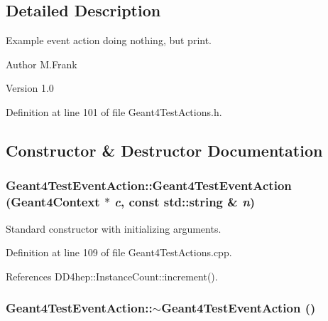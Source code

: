 \subsection{Detailed Description}
Example event action doing nothing, but print. \begin{DoxyAuthor}{Author}
M.Frank 
\end{DoxyAuthor}
\begin{DoxyVersion}{Version}
1.0 
\end{DoxyVersion}


Definition at line 101 of file Geant4TestActions.h.

\subsection{Constructor \& Destructor Documentation}
\hypertarget{class_d_d4hep_1_1_simulation_1_1_test_1_1_geant4_test_event_action_a00fe97a5df38edd9785f25af737cd7d0}{
\subsubsection[{Geant4TestEventAction}]{\setlength{\rightskip}{0pt plus 5cm}Geant4TestEventAction::Geant4TestEventAction ({\bf Geant4Context} $\ast$ {\em c}, \/  const std::string \& {\em n})}}
\label{class_d_d4hep_1_1_simulation_1_1_test_1_1_geant4_test_event_action_a00fe97a5df38edd9785f25af737cd7d0}


Standard constructor with initializing arguments. 

Definition at line 109 of file Geant4TestActions.cpp.

References DD4hep::InstanceCount::increment().\hypertarget{class_d_d4hep_1_1_simulation_1_1_test_1_1_geant4_test_event_action_abef0a0d05514f5882003ae2f45e59ed7}{
\subsubsection[{$\sim$Geant4TestEventAction}]{\setlength{\rightskip}{0pt plus 5cm}Geant4TestEventAction::$\sim$Geant4TestEventAction ()}}
\label{class_d_d4hep_1_1_simulation_1_1_test_1_1_geant4_test_event_action_abef0a0d05514f5882003ae2f45e59ed7}


